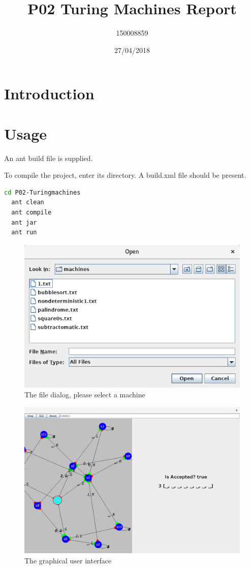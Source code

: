 \documentclass{article}
\title{P02 Turing Machines Report}
\date{27/04/2018}
\author{150008859}
\begin{document}
\maketitle
\newpage


\section{Introduction}


\section{Usage}

An ant build file is supplied. 

To compile the project, enter its directory. A build.xml file should be present. 

\begin{lstlisting}[language=bash]
  cd P02-Turingmachines
  ant clean
  ant compile
  ant jar
  ant run
\end{lstlisting}

\begin{figure}[!htb]
  \caption{The file dialog, please select a machine}
  \centering
  \includegraphics[scale=0.30]{images/filedialog.png}
\end{figure}

\begin{figure}[!htb]
  \caption{The graphical user interface}
  \centering
  \includegraphics[scale=0.15]{images/gui1.png}
\end{figure}
\end{document}
